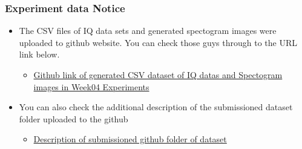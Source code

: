 \begin{mdframed}[backgroundcolor = gray!20] 
    \vspace{-5mm}
    \begin{center}
        \subsubsection*{\large Experiment data Notice}
            \vspace{-2mm}
            \begin{itemize}
                \item {\small The CSV files of IQ data sets and generated spectogram images were uploaded to
                github website. You can check those guys through to the URL link below.\\
                } \vspace{-2mm}
                \begin{itemize}
                    \item \href{https://github.com/Intern-yunshin-cho/Network-Lab-Week4-Results_Share}
            		{Github link of generated CSV dataset of IQ datas and Spectogram images in Week04 Experiments}
                    \end{itemize}
                \vspace{-4mm}
                \item {\small You can also check the additional description of the submissioned dataset folder uploaded to the github }
                \vspace{-2mm}
                \begin{itemize}
                    \item \href{https://acidic-duke-bb9.notion.site/Week-04-submissioned-data-description-4c73cb4d3c5c413994ddd17a0785c6e6}
            		{Description of submissioned github folder of dataset}
                \end{itemize}
            \end{itemize}
    \end{center}
\end{mdframed}